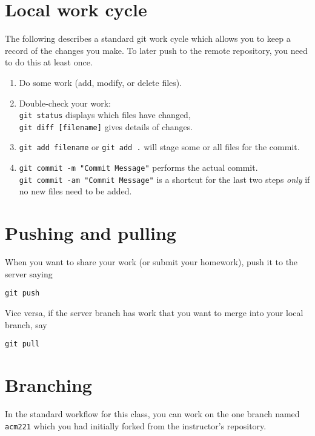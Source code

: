 \documentclass[twocolumn,secnumarabic,rmp]{revtex4}
\begin{document}
\section{Local work cycle}

The following describes a standard \textsf{git} work cycle which
allows you to keep a record of the changes you make.  To later push
to the remote repository, you need to do this at least once.
\begin{enumerate}
\item Do some work (add, modify, or delete files).
\item Double-check your work: \\
\verb+git status+ displays which files
have changed, \\
\verb+git diff [filename]+ gives details of changes.
\item \verb+git add filename+ or \verb+git add .+ will stage some or
all files for the commit.
\item \verb+git commit -m "Commit Message"+ performs
the actual commit.  \\
\verb+git commit -am "Commit Message"+ is a shortcut
for the last two steps \emph{only} if no new files need to be
added. 
\end{enumerate}

\section{Pushing and pulling}

When you want to share your work (or submit your homework), push it to
the server saying
\begin{verbatim}
git push 
\end{verbatim}
Vice versa, if the server branch has work that you want to merge into
your local branch, say
\begin{verbatim}
git pull
\end{verbatim}

\section{Branching}

In the standard workflow for this class, you can work on the one
branch named \texttt{acm221} which you had initially forked from the
instructor's repository.  
\end{document}

